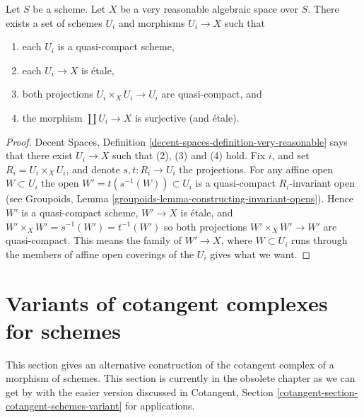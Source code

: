 \begin{lemma}
\label{lemma-very-reasonable-quasi-compact-pieces}
Let $S$ be a scheme.
Let $X$ be a very reasonable algebraic space over $S$.
There exists a set of schemes
$U_i$ and morphisms $U_i \to X$ such that
\begin{enumerate}
\item each $U_i$ is a quasi-compact scheme,
\item each $U_i \to X$ is \'etale,
\item both projections $U_i \times_X U_i \to U_i$ are quasi-compact, and
\item the morphism $\coprod U_i \to X$ is surjective (and \'etale).
\end{enumerate}
\end{lemma}

\begin{proof}
Decent Spaces, Definition \ref{decent-spaces-definition-very-reasonable}
says that there exist $U_i \to X$ such that (2), (3) and (4) hold.
Fix $i$, and set $R_i = U_i \times_X U_i$, and denote $s, t : R_i \to U_i$
the projections.
For any affine open $W \subset U_i$ the open $W' = t(s^{-1}(W)) \subset U_i$
is a quasi-compact $R_i$-invariant open (see
Groupoids, Lemma \ref{groupoids-lemma-constructing-invariant-opens}).
Hence $W'$ is a quasi-compact scheme, $W' \to X$ is \'etale, and
$W' \times_X W' = s^{-1}(W') = t^{-1}(W')$ so both projections
$W' \times_X W' \to W'$ are quasi-compact. This means the family of
$W' \to X$, where $W \subset U_i$ runs through the members of affine
open coverings of the $U_i$ gives what we want.
\end{proof}



\section{Variants of cotangent complexes for schemes}
\label{section-cotangent-schemes-variant}

\noindent
This section gives an alternative construction of the cotangent complex
of a morphism of schemes. This section is currently in the obsolete
chapter as we can get by with the easier version discussed in
Cotangent, Section \ref{cotangent-section-cotangent-schemes-variant}
for applications.

